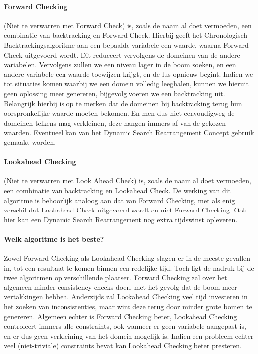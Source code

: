 \paragraph{Forward Checking} (Niet te verwarren met Forward Check) is, zoals de naam al doet vermoeden, een combinatie van backtracking en Forward Check. Hierbij geeft het Chronologisch Backtrackingsalgoritme aan een bepaalde variabele een waarde, waarna Forward Check uitgevoerd wordt. Dit reduceert vervolgens de domeinen van de andere variabelen. Vervolgens zullen we een niveau lager in de boom zoeken, en een andere variabele een waarde toewijzen krijgt, en de lus opnieuw begint. Indien we tot situaties komen waarbij we een domein volledig leeghalen, kunnen we hieruit geen oplossing meer genereren, bijgevolg voeren we een backtracking uit. Belangrijk hierbij is op te merken dat de domeinen bij backtracking terug hun oorspronkelijke waarde moeten bekomen. En men dus niet eenvoudigweg de domeinen telkens mag verkleinen, deze hangen immers af van de gekozen waarden. Eventueel kan van het Dynamic Search Rearrangement Concept gebruik gemaakt worden.
\paragraph{Lookahead Checking} (Niet te verwarren met Look Ahead Check) is, zoals de naam al doet vermoeden, een combinatie van backtracking en Lookahead Check. De werking van dit algoritme is behoorlijk analoog aan dat van Forward Checking, met als enig verschil dat Lookahead Check uitgevoerd wordt en niet Forward Checking. Ook hier kan een Dynamic Search Rearrangement nog extra tijdswinst opleveren.
\paragraph{Welk algoritme is het beste?}
Zowel Forward Checking als Lookahead Checking slagen er in de meeste gevallen in, tot een resultaat te komen binnen een redelijke tijd. Toch ligt de nadruk bij de twee algoritmen op verschillende plaatsen. Forward Checking zal over het algemeen minder consistency checks doen, met het gevolg dat de boom meer vertakkingen hebben. Anderzijds zal Lookahead Checking veel tijd investeren in het zoeken van inconsistenties, maar wint deze terug door minder grote bomen te genereren. Algemeen echter is Forward Checking beter, Lookahead Checking controleert immers alle constraints, ook wanneer er geen variabele aangepast is, en er dus geen verkleining van het domein mogelijk is. Indien een probleem echter veel (niet-triviale) constraints bevat kan Lookahead Checking beter presteren.

